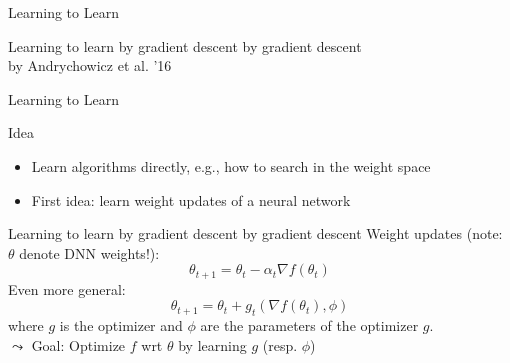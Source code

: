 \begin{frame}[c]{Learning to Learn}

\centering
\huge
Learning to learn by gradient descent by gradient descent\\
by Andrychowicz et al. '16


\end{frame}
\begin{frame}[c]{Learning to Learn}

\begin{block}{Idea}
\begin{itemize}
	\item Learn algorithms directly, e.g., how to search in the weight space
	\item First idea: learn weight updates of a neural network
\end{itemize}
\end{block}

\pause

\begin{block}{Learning to learn by gradient descent by gradient descent\newline {}}
Weight updates (note: \alert{$\theta$ denote DNN weights!}):
\begin{equation}
\theta_{t+1} = \theta_t - \alpha_t \nabla f(\theta_t) \nonumber
\end{equation}
\pause
Even more general:
\begin{equation}
\theta_{t+1} = \theta_t + g_t(\nabla f(\theta_t), \phi) \nonumber
\end{equation}
where $g$ is the optimizer and $\phi$ are the parameters of the optimizer $g$.\\
\pause
$\leadsto$ \alert{Goal: Optimize $f$ wrt $\theta$ by learning $g$ (resp. $\phi$)}
\end{block}

\end{frame}
